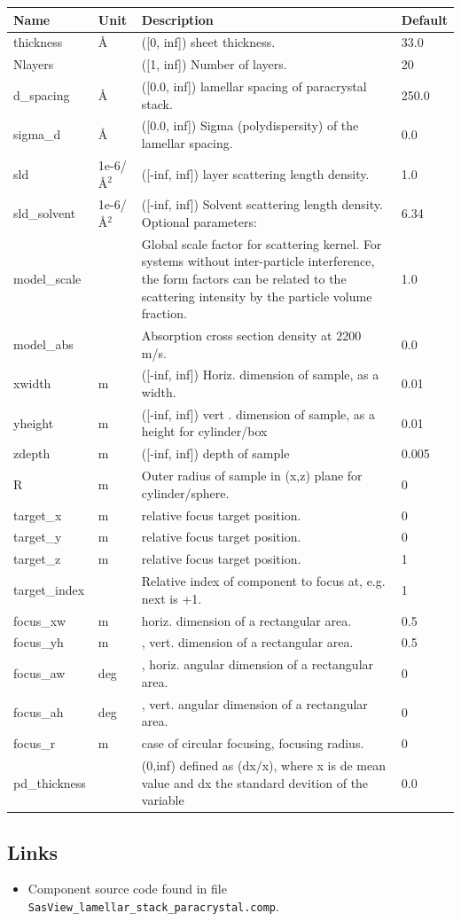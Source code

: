 \begin{longtable}{p{}p{}p{}p{}}
\toprule
\textbf{Name} & \textbf{Unit} & \textbf{Description} & \textbf{Default} \\
\midrule
\endhead
thickness & \AA{} & ([0, inf]) sheet thickness. & 33.0 \\
Nlayers &  & ([1, inf]) Number of layers. & 20 \\
d\_spacing & \AA{} & ([0.0, inf]) lamellar spacing of paracrystal stack. & 250.0 \\
sigma\_d & \AA{} & ([0.0, inf]) Sigma (polydispersity) of the lamellar spacing. & 0.0 \\
sld & 1e-6/\AA{}$^{2}$ & ([-inf, inf]) layer scattering length density. & 1.0 \\
sld\_solvent & 1e-6/\AA{}$^{2}$ & ([-inf, inf]) Solvent scattering length density. Optional parameters: & 6.34 \\
model\_scale &   & Global scale factor for scattering kernel. For systems without inter-particle interference, the form factors can be related to the scattering intensity by the particle volume fraction. & 1.0 \\
model\_abs &   & Absorption cross section density at 2200 m/s. & 0.0 \\
xwidth & m & ([-inf, inf]) Horiz. dimension of sample, as a width. & 0.01 \\
yheight & m & ([-inf, inf]) vert . dimension of sample, as a height for cylinder/box & 0.01 \\
zdepth & m & ([-inf, inf]) depth of sample & 0.005 \\
R & m & Outer radius of sample in (x,z) plane for cylinder/sphere. & 0 \\
target\_x & m & relative focus target position. & 0 \\
target\_y & m & relative focus target position. & 0 \\
target\_z & m & relative focus target position. & 1 \\
target\_index &   & Relative index of component to focus at, e.g. next is +1. & 1 \\
focus\_xw & m & horiz. dimension of a rectangular area. & 0.5 \\
focus\_yh & m & , vert. dimension of a rectangular area. & 0.5 \\
focus\_aw & deg & , horiz. angular dimension of a rectangular area. & 0 \\
focus\_ah & deg & , vert. angular dimension of a rectangular area. & 0 \\
focus\_r & m & case of circular focusing, focusing radius. & 0 \\
pd\_thickness &  & (0,inf) defined as (dx/x), where x is de mean value and dx the standard devition of the variable & 0.0 \\
\bottomrule
\end{longtable}

\subsection*{Links}
\begin{itemize}
  \item Component source code found in file \texttt{SasView\_lamellar\_stack\_paracrystal.comp}.
\end{itemize}
